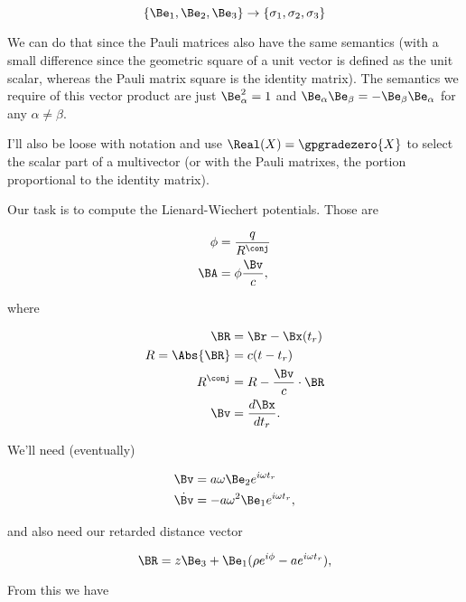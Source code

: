 \begin{equation}\label{eqn:relativisticElectrodynamicsExamReflection:n}
\{\Be_1, \Be_2, \Be_3\} \rightarrow \{\sigma_1, \sigma_2, \sigma_3\}
\end{equation}

We can do that since the Pauli matrices also have the same semantics (with a small difference since the geometric square of a unit vector is defined as the unit scalar, whereas the Pauli matrix square is the identity matrix).  The semantics we require of this vector product are just $\Be_\alpha^2 = 1$ and $\Be_\alpha \Be_\beta = - \Be_\beta \Be_\alpha$ for any $\alpha \ne \beta$.

I'll also be loose with notation and use $\Real(X) = \gpgradezero{X}$ to select the scalar part of a multivector (or with the Pauli matrixes, the portion proportional to the identity matrix).

Our task is to compute the Lienard-Wiechert potentials.  Those are

\begin{align}\label{eqn:relativisticElectrodynamicsExamReflection:n}
\phi &= \frac{q}{R^\conj} \\
\BA &= \phi \frac{\Bv}{c},
\end{align}

where

\begin{align}\label{eqn:relativisticElectrodynamicsExamReflection:n}
\BR &= \Br - \Bx(t_r) \\
R = \Abs{\BR} &= c (t - t_r) \\
R^\conj &= R - \frac{\Bv}{c} \cdot \BR \\
\Bv &= \frac{d\Bx}{dt_r}.
\end{align}

We'll need (eventually)

\begin{align}\label{eqn:relativisticElectrodynamicsExamReflection:n}
\Bv &= a \omega \Be_2 e^{i \omega t_r} \\
\dot{\Bv} &= -a \omega^2 \Be_1 e^{i \omega t_r},
\end{align}

and also need our retarded distance vector

\begin{equation}\label{eqn:relativisticElectrodynamicsExamReflection:n}
\BR = z \Be_3 + \Be_1 (\rho e^{i \phi} - a e^{i \omega t_r} ),
\end{equation}

From this we have

